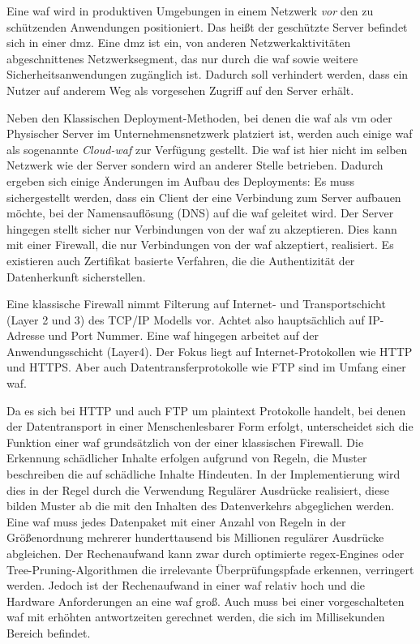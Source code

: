 Eine \ac{waf} wird in produktiven Umgebungen in einem Netzwerk \textit{vor} den zu schützenden Anwendungen positioniert.
Das heißt der geschützte Server befindet sich in einer \ac{dmz}.
Eine \ac{dmz} ist ein, von anderen Netzwerkaktivitäten abgeschnittenes Netzwerksegment, das nur durch die \ac{waf} sowie weitere Sicherheitsanwendungen zugänglich ist.
Dadurch soll verhindert werden, dass ein Nutzer auf anderem Weg als vorgesehen Zugriff auf den Server erhält.

Neben den Klassischen Deployment-Methoden, bei denen die \ac{waf} als \ac{vm} oder Physischer Server im Unternehmensnetzwerk platziert ist, werden auch einige \ac{waf} als sogenannte \textit{Cloud-\ac{waf}} zur Verfügung gestellt.
Die \ac{waf} ist hier nicht im selben Netzwerk wie der Server sondern wird an anderer Stelle betrieben.
Dadurch ergeben sich einige Änderungen im Aufbau des Deployments:
Es muss sichergestellt werden, dass ein Client der eine Verbindung zum Server aufbauen möchte, bei der Namensauflösung (DNS) auf die \ac{waf} geleitet wird.
Der Server hingegen stellt sicher nur Verbindungen von der \ac{waf} zu akzeptieren.
Dies kann mit einer Firewall, die nur Verbindungen von der \ac{waf} akzeptiert, realisiert.
Es existieren auch Zertifikat basierte Verfahren, die die Authentizität der Datenherkunft sicherstellen.

Eine klassische Firewall nimmt Filterung auf Internet- und Transportschicht (Layer 2 und 3) des TCP/IP Modells vor.
Achtet also hauptsächlich auf IP-Adresse und Port Nummer.
Eine \ac{waf} hingegen arbeitet auf der Anwendungsschicht (Layer4).
Der Fokus liegt auf Internet-Protokollen wie HTTP und HTTPS. 
Aber auch Datentransferprotokolle wie FTP sind im Umfang einer \ac{waf}.

Da es sich bei HTTP und auch FTP um plaintext Protokolle handelt, bei denen der Datentransport in einer Menschenlesbarer Form erfolgt, unterscheidet sich die Funktion einer \ac{waf} grundsätzlich von der einer klassischen Firewall.
Die Erkennung schädlicher Inhalte erfolgen aufgrund von Regeln, die Muster beschreiben die auf schädliche Inhalte Hindeuten.
In der Implementierung wird dies in der Regel durch die Verwendung Regulärer Ausdrücke realisiert, diese bilden Muster ab die mit den Inhalten des Datenverkehrs abgeglichen werden.
Eine \ac{waf} muss jedes Datenpaket mit einer Anzahl von Regeln in der Größenordnung mehrerer hunderttausend bis Millionen regulärer Ausdrücke abgleichen.
Der Rechenaufwand kann zwar durch optimierte regex-Engines oder Tree-Pruning-Algorithmen die irrelevante Überprüfungspfade erkennen, verringert werden.
Jedoch ist der Rechenaufwand in einer \ac{waf} relativ hoch und die Hardware Anforderungen an eine \ac{waf} groß.
Auch muss bei einer vorgeschalteten \ac{waf} mit erhöhten antwortzeiten gerechnet werden, die sich im Millisekunden Bereich befindet.

